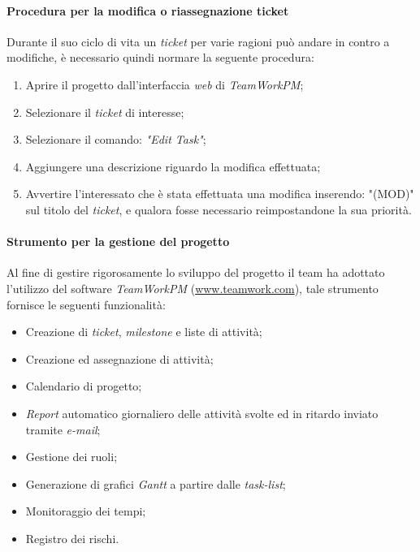 \paragraph{Procedura per la modifica o riassegnazione ticket} 
Durante il suo ciclo di vita un \textit{ticket} per varie ragioni può andare in contro a modifiche, è necessario quindi normare la seguente procedura:
\begin{enumerate}
\item Aprire il progetto dall'interfaccia \textit{web} di \textit{TeamWorkPM};
\item Selezionare il \textit{ticket} di interesse;
\item Selezionare il comando: \emph{"Edit Task"};
\item Aggiungere una descrizione riguardo la modifica effettuata;
\item Avvertire l'interessato che è stata effettuata una modifica inserendo: "(MOD)" sul titolo del \textit{ticket}, e qualora fosse necessario reimpostandone la sua priorità.
\end{enumerate}
\paragraph{Strumento per la gestione del progetto}
Al fine di gestire rigorosamente lo sviluppo del progetto il team \gruppo{} ha adottato l'utilizzo del software \textit{TeamWorkPM} (\href{http://www.teamwork.com}{www.teamwork.com}), tale strumento fornisce le seguenti funzionalità:

\begin{itemize}
\item Creazione di \textit{ticket}, \textit{milestone} e liste di attività;
\item Creazione ed assegnazione di attività;
\item Calendario di progetto;
\item \textit{Report} automatico giornaliero delle attività svolte ed in ritardo inviato tramite \textit{e-mail};
\item Gestione dei ruoli;
\item Generazione di grafici \textit{Gantt} a partire dalle \textit{task-list};
\item Monitoraggio dei tempi;
\item Registro dei rischi.
\end{itemize}

